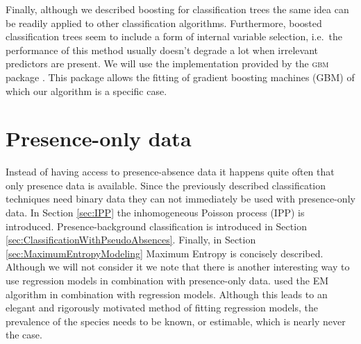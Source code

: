 Finally, although we described boosting for classification trees the same idea can be readily applied to other classification algorithms. Furthermore, boosted classification trees seem to include a form of internal variable selection, i.e.\ the performance of this method usually doesn't degrade a lot when irrelevant predictors are present. We will use the implementation provided by the \textsc{gbm} package \parencite{gbm}. This package allows the fitting of gradient boosting machines (GBM) of which our algorithm is a specific case.

\section{Presence-only data}
\label{sec:PresenceOnlyData}
Instead of having access to presence-absence data it happens quite often that only presence data is available. Since the previously described classification techniques need binary data they can not immediately be used with presence-only data. In Section \ref{sec:IPP} the inhomogeneous Poisson process (IPP) is introduced. Presence-background classification is introduced in Section \ref{sec:ClassificationWithPseudoAbsences}. Finally, in Section \ref{sec:MaximumEntropyModeling} Maximum Entropy \parencite[MaxEnt;][]{phillips_maximum_2006,phillips_modeling_2008} is concisely described. \\ 

Although we will not consider it we note that there is another interesting way to use regression models in combination with presence-only data. \cite{ward_presence-only_2009} used the EM algorithm \parencite{dempster_maximum_1977} in combination with regression models. Although this leads to an elegant and rigorously motivated method of fitting regression models, the prevalence of the species needs to be known, or estimable, which is nearly never the case.

